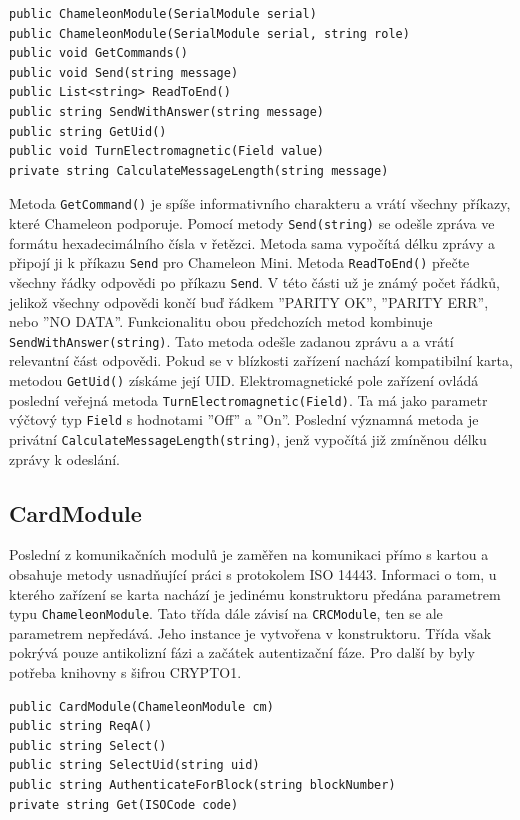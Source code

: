 \begin{lstlisting}[caption=Metody třídy \emph{ChameleonModule}, label={chameleonModuleMethods}]
public ChameleonModule(SerialModule serial)
public ChameleonModule(SerialModule serial, string role)
public void GetCommands()
public void Send(string message)
public List<string> ReadToEnd()
public string SendWithAnswer(string message)
public string GetUid()
public void TurnElectromagnetic(Field value)
private string CalculateMessageLength(string message)
\end{lstlisting}

Metoda \verb|GetCommand()| je spíše informativního charakteru a vrátí všechny příkazy, které Chameleon podporuje. Pomocí metody \verb|Send(string)| se odešle zpráva ve formátu hexadecimálního čísla v řetězci. Metoda sama vypočítá délku zprávy a připojí ji k příkazu \verb|Send| pro Chameleon Mini. Metoda \verb|ReadToEnd()| přečte všechny řádky odpovědi po příkazu \verb|Send|. V této části už je známý počet řádků, jelikož všechny odpovědi končí buď řádkem ''PARITY OK'', ''PARITY ERR'', nebo ''NO DATA''. Funkcionalitu obou předchozích metod kombinuje \verb|SendWithAnswer(string)|. Tato metoda odešle zadanou zprávu a a vrátí relevantní část odpovědi. Pokud se v blízkosti zařízení nachází kompatibilní karta, metodou \verb|GetUid()| získáme její UID. Elektromagnetické pole zařízení ovládá poslední veřejná metoda \verb|TurnElectromagnetic(Field)|. Ta má jako parametr výčtový typ \verb|Field| s hodnotami ''Off'' a ''On''. Poslední významná metoda je privátní \verb|CalculateMessageLength(string)|, jenž vypočítá již zmíněnou délku zprávy k odeslání. 

\subsection*{CardModule}
Poslední z komunikačních modulů je zaměřen na komunikaci  přímo s kartou a obsahuje metody usnadňující práci s protokolem ISO 14443. Informaci o tom, u kterého zařízení se karta nachází je jedinému konstruktoru předána parametrem typu \verb|ChameleonModule|. Tato třída dále závisí na \verb|CRCModule|, ten se ale parametrem nepředává. Jeho instance je vytvořena v konstruktoru. Třída však pokrývá pouze antikolizní fázi a začátek autentizační fáze. Pro další by byly potřeba knihovny s šifrou CRYPTO1. 
\begin{lstlisting}[caption=Metody třídy \emph{CardModule}, label={cardModuleMethods}]
public CardModule(ChameleonModule cm)
public string ReqA()
public string Select()
public string SelectUid(string uid)
public string AuthenticateForBlock(string blockNumber)
private string Get(ISOCode code)
\end{lstlisting}

